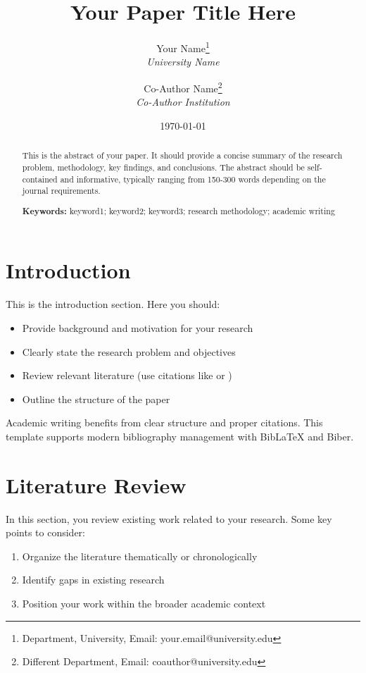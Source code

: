 \documentclass[a4paper, 12pt, oneside]{article}
\title{Your Paper Title Here}
\author{
    Your Name\thanks{Department, University, Email: your.email@university.edu} \\
    \textit{University Name} \\
    \and
    Co-Author Name\thanks{Different Department, Email: coauthor@university.edu} \\
    \textit{Co-Author Institution}
}
\date{\today}
\theoremstyle{definition}
\theoremstyle{remark}
\begin{document}
\maketitle

\begin{abstract}
This is the abstract of your paper. It should provide a concise summary of the research problem, methodology, key findings, and conclusions. The abstract should be self-contained and informative, typically ranging from 150-300 words depending on the journal requirements.

\smallskip
\noindent \textbf{Keywords:} keyword1; keyword2; keyword3; research methodology; academic writing
\end{abstract}

\section{Introduction}
\label{sec:introduction}

This is the introduction section. Here you should:
\begin{itemize}
    \item Provide background and motivation for your research
    \item Clearly state the research problem and objectives
    \item Review relevant literature (use citations like \textcite{sample2023} or \parencite{example2022})
    \item Outline the structure of the paper
\end{itemize}

Academic writing benefits from clear structure and proper citations. This template supports modern bibliography management with BibLaTeX and Biber.

\section{Literature Review}
\label{sec:literature}

In this section, you review existing work related to your research. Some key points to consider:

\begin{enumerate}
    \item Organize the literature thematically or chronologically
    \item Identify gaps in existing research
    \item Position your work within the broader academic context
\end{enumerate}
\end{document}
